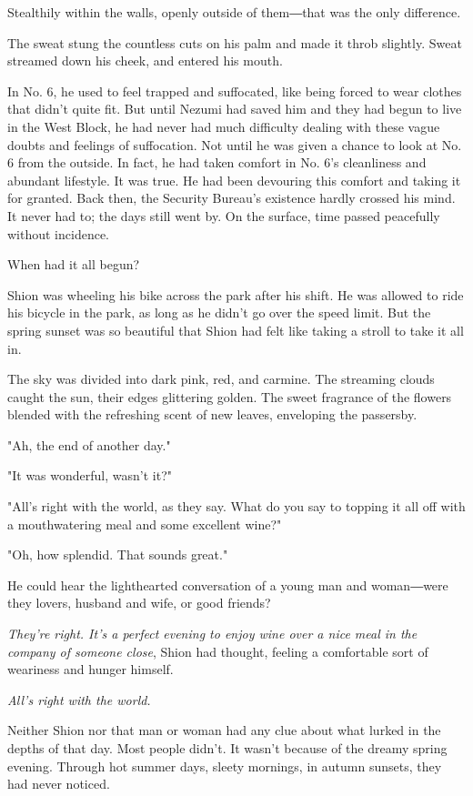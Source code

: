 Stealthily within the walls, openly outside of them―that was the only
difference.

The sweat stung the countless cuts on his palm and made it throb
slightly. Sweat streamed down his cheek, and entered his mouth.

In No. 6, he used to feel trapped and suffocated, like being forced to
wear clothes that didn't quite fit. But until Nezumi had saved him and
they had begun to live in the West Block, he had never had much
difficulty dealing with these vague doubts and feelings of suffocation.
Not until he was given a chance to look at No. 6 from the outside. In
fact, he had taken comfort in No. 6's cleanliness and abundant
lifestyle. It was true. He had been devouring this comfort and taking it
for granted. Back then, the Security Bureau's existence hardly crossed
his mind. It never had to; the days still went by. On the surface, time
passed peacefully without incidence.

When had it all begun?

Shion was wheeling his bike across the park after his shift. He was
allowed to ride his bicycle in the park, as long as he didn't go over
the speed limit. But the spring sunset was so beautiful that Shion had
felt like taking a stroll to take it all in.

The sky was divided into dark pink, red, and carmine. The streaming
clouds caught the sun, their edges glittering golden. The sweet
fragrance of the flowers blended with the refreshing scent of new
leaves, enveloping the passersby.

"Ah, the end of another day."

"It was wonderful, wasn't it?"

"All's right with the world, as they say. What do you say to topping it
all off with a mouthwatering meal and some excellent wine?"

"Oh, how splendid. That sounds great."

He could hear the lighthearted conversation of a young man and
woman―were they lovers, husband and wife, or good friends?

\emph{They're right. It's a perfect evening to enjoy wine over a nice meal in
the company of someone close}, Shion had thought, feeling a comfortable
sort of weariness and hunger himself.

\emph{All's right with the world.}

Neither Shion nor that man or woman had any clue about what lurked in
the depths of that day. Most people didn't. It wasn't because of the
dreamy spring evening. Through hot summer days, sleety mornings, in
autumn sunsets, they had never noticed.

